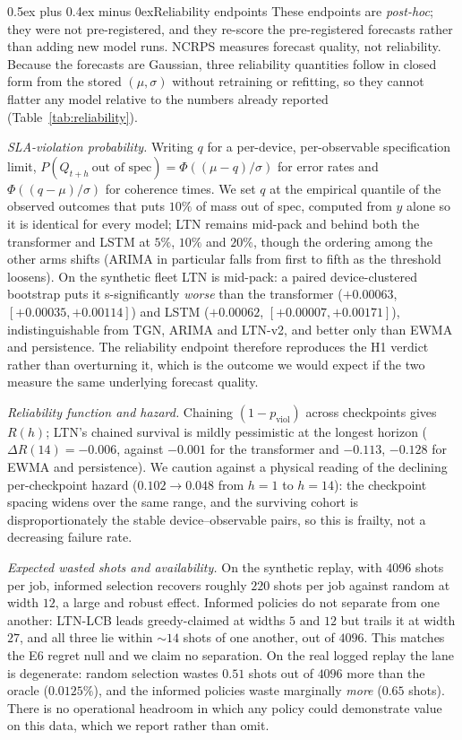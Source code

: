\documentclass[journal]{IEEEtran}
\makeatletter
\def\subsection{\@startsection{subsection}{2}{\z@}{1.8ex plus 1ex minus 0.75ex}%
{0.5ex plus 0.4ex minus 0ex}{\normalfont\normalsize\itshape}}
\makeatother
\begin{document}
\subsection{Reliability endpoints}\label{sec:reliability}
These endpoints are \emph{post-hoc}; they were not pre-registered, and they re-score
the pre-registered forecasts rather than adding new model runs. NCRPS measures
forecast quality, not reliability. Because the forecasts are Gaussian,
three reliability quantities follow in closed form from the stored $(\mu,\sigma)$
without retraining or refitting, so they cannot flatter any model relative to the
numbers already reported (Table~\ref{tab:reliability}).

\emph{SLA-violation probability.} Writing $q$ for a per-device, per-observable
specification limit, $P(Q_{t+h}\ \text{out of spec}) = \Phi((\mu-q)/\sigma)$ for error
rates and $\Phi((q-\mu)/\sigma)$ for coherence times. We set $q$ at the empirical
quantile of the observed outcomes that puts $10\%$ of mass out of spec, computed from
$y$ alone so it is identical for every model; LTN remains mid-pack and behind both the transformer and LSTM at
$5\%$, $10\%$ and $20\%$, though the ordering among the other arms shifts (ARIMA in
particular falls from first to fifth as the threshold loosens). On the synthetic fleet LTN is mid-pack: a paired device-clustered
bootstrap puts it s-significantly \emph{worse} than the transformer
($+0.00063$, $[+0.00035, +0.00114]$) and LSTM ($+0.00062$, $[+0.00007, +0.00171]$),
indistinguishable from TGN, ARIMA and LTN-v2, and better only than EWMA and
persistence. The reliability endpoint therefore reproduces the H1 verdict rather than
overturning it, which is the outcome we would expect if the two measure the same
underlying forecast quality.

\emph{Reliability function and hazard.} Chaining $(1-p_{\mathrm{viol}})$ across
checkpoints gives $R(h)$; LTN's chained survival is mildly pessimistic at the longest
horizon ($\Delta R(14) = -0.006$, against $-0.001$ for the transformer and $-0.113$,
$-0.128$ for EWMA and persistence). We caution against a physical reading of the
declining per-checkpoint hazard ($0.102 \to 0.048$ from $h{=}1$ to $h{=}14$): the
checkpoint spacing widens over the same range, and the surviving cohort is
disproportionately the stable device--observable pairs, so this is frailty, not a
decreasing failure rate.

\emph{Expected wasted shots and availability.} On the synthetic replay, with $4096$
shots per job, informed selection recovers roughly $220$ shots per job against random
at width $12$, a large and robust effect. Informed policies do not separate from one
another: LTN-LCB leads greedy-claimed at widths $5$ and $12$ but trails it at width
$27$, and all three lie within $\sim14$ shots of one another, out of $4096$. This matches the E6 regret
null and we claim no separation. On the real logged replay the lane is degenerate:
random selection wastes $0.51$ shots out of $4096$ more than the oracle
($0.0125\%$), and the informed policies waste marginally \emph{more} ($0.65$ shots).
There is no operational headroom in which any policy could demonstrate value on this
data, which we report rather than omit.
\end{document}
